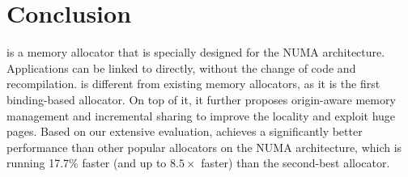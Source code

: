 \section{Conclusion}
\label{sec:conclusion}

\NM{} is a memory allocator that is specially designed for the NUMA architecture. Applications can be linked to \NM{} directly, without the change of code and recompilation. \NM{} is different from existing memory allocators, as it is the first binding-based allocator. 
On top of it, it further proposes origin-aware memory management and incremental sharing to improve the locality and exploit huge pages. 
Based on our extensive evaluation, \NM{} achieves a significantly better performance than other popular allocators on the NUMA architecture, which is running 17.7\% faster (and up to $8.5\times$ faster) than the second-best allocator.
